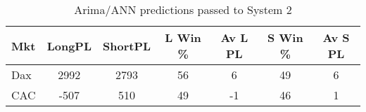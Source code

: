 \begin{table}[ht]
\centering
\caption[Arima/ANN predictions passed to System 2.]{Arima/ANN predictions passed to System 2} 
\label{tab:chp_ts:arima_ann_sys2}
\begin{tabular}{lcccccc}
  \toprule Mkt & LongPL & ShortPL & L Win \% & Av L PL & S Win \% & Av S PL \\ 
  \midrule Dax & 2992 & 2793 & 56 & 6 & 49 & 6 \\ 
  CAC & -507 & 510 & 49 & -1 & 46 & 1 \\ 
   \bottomrule \end{tabular}
\end{table}
